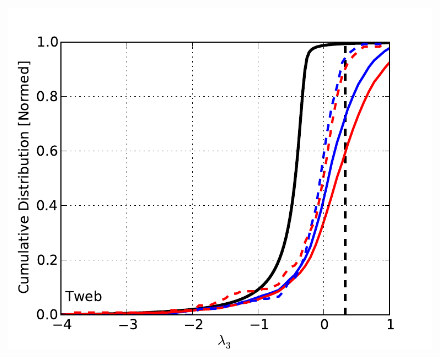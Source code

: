 \documentclass[a4,useAMS,usenatbib,usegraphicx]{latex/mn2e}
\begin{document}
\begin{flushleft}
\begin{figure}
\begin{center}
  \includegraphics[trim = 3mm 0mm 10mm 8mm, clip, keepaspectratio=true,
  width=0.24\textheight]{./figures/eigen3_dist_Tweb}


\end{center}
\end{figure}
\end{flushleft}
\end{document}
